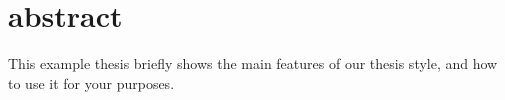 \chapter{abstract}
  This example thesis briefly shows the main features of our thesis
  style, and how to use it for your purposes.

